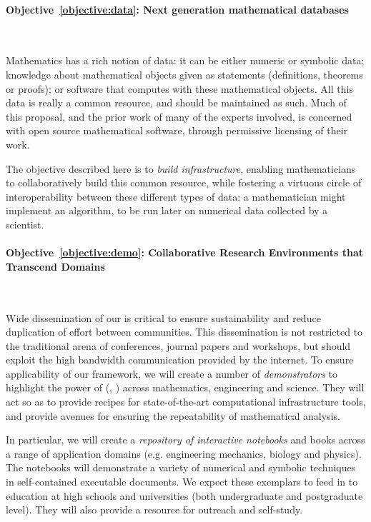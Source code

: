 \documentclass[noworkareas,deliverables,\classoptions]{euproposal}       %
\begin{document}
\begin{proposal}
\paragraph{Objective~\ref{objective:data}: Next generation mathematical databases}\ 

Mathematics has a rich notion of data: it can be either
numeric or symbolic data; knowledge about mathematical objects given as
statements (definitions, theorems or proofs); or software that computes
with these mathematical objects.
%
All this data is really a common resource, and should be maintained as
such. Much of this proposal, and the prior work of many of the experts
involved, is concerned with open source mathematical software, through
permissive licensing of their work.

The objective described here is to \emph{build infrastructure},
enabling mathematicians to collaboratively build this common resource,
while fostering a virtuous circle of interoperability between these
different types of data: a mathematician might implement an
algorithm, to be run later on numerical data collected by a
scientist.

\paragraph{Objective~\ref{objective:demo}: Collaborative Research Environments that Transcend Domains}\ 

Wide dissemination of our \VREs is critical to ensure sustainability
and reduce duplication of effort between communities. This
dissemination is not restricted to the traditional arena of
conferences, journal papers and workshops, but should exploit the high
bandwidth communication provided by the internet. To ensure
applicability of our framework, we will create a number of
\emph{demonstrators} to highlight the power of \TheProject{}
(, ) across mathematics,
engineering and science. They will act so as to provide recipes for
state-of-the-art computational infrastructure tools, and provide
avenues for ensuring the repeatability of mathematical analysis.

In particular, we will create a \emph{repository of interactive
  notebooks}  and books across a range
of application domains (e.g. engineering mechanics, biology and
physics). The notebooks will demonstrate a variety of numerical and
symbolic techniques in self-contained executable documents. We expect
these exemplars to feed in to education at high schools and
universities (both undergraduate and postgraduate level). They will
also provide a resource for outreach and self-study.


\end{proposal}
\end{document}
